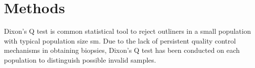 \chapter{Methods}

Dixon's Q test is common statistical tool to reject outliners in a small population with typical population size sm. Due to the lack of persistent quality control mechanisms in obtaining biopsies, Dixon's Q test has been conducted on each population to distinguish possible invalid samples. 